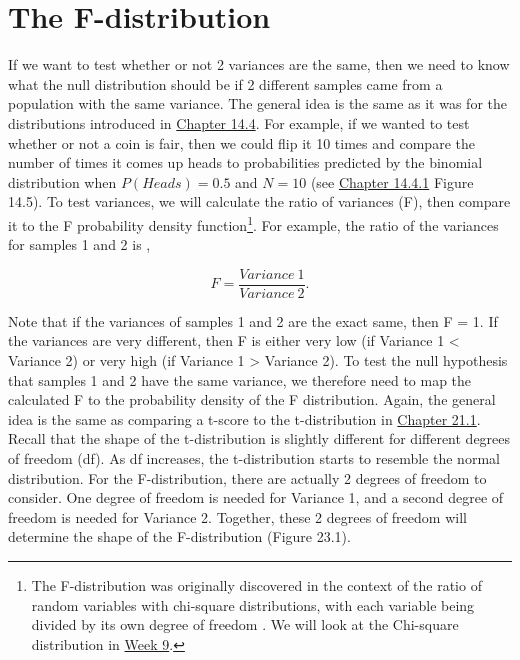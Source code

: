 \documentclass[
]{scrbook}
\begin{document}
\hypertarget{the-f-distribution}{%
\section{The F-distribution}\label{the-f-distribution}}

If we want to test whether or not 2 variances are the same, then we need to know what the null distribution should be if 2 different samples came from a population with the same variance.
The general idea is the same as it was for the distributions introduced in \protect\hyperlink{probability-distributions}{Chapter 14.4}.
For example, if we wanted to test whether or not a coin is fair, then we could flip it 10 times and compare the number of times it comes up heads to probabilities predicted by the binomial distribution when \(P(Heads) = 0.5\) and \(N = 10\) (see \protect\hyperlink{binomial-distribution}{Chapter 14.4.1} Figure 14.5).
To test variances, we will calculate the ratio of variances (F), then compare it to the F probability density function\footnote{The F-distribution was originally discovered in the context of the ratio of random variables with chi-square distributions, with each variable being divided by its own degree of freedom \citep{Miller2004}. We will look at the Chi-square distribution in \protect\hyperlink{Week9}{Week 9}.}.
For example, the ratio of the variances for samples 1 and 2 is \citep{Sokal1995},

\[F = \frac{Variance\:1}{Variance\:2}.\]

Note that if the variances of samples 1 and 2 are the exact same, then F = 1.
If the variances are very different, then F is either very low (if Variance 1 \textless{} Variance 2) or very high (if Variance 1 \textgreater{} Variance 2).
To test the null hypothesis that samples 1 and 2 have the same variance, we therefore need to map the calculated F to the probability density of the F distribution.
Again, the general idea is the same as comparing a t-score to the t-distribution in \protect\hyperlink{one-sample-t-test}{Chapter 21.1}.
Recall that the shape of the t-distribution is slightly different for different degrees of freedom (df).
As df increases, the t-distribution starts to resemble the normal distribution.
For the F-distribution, there are actually 2 degrees of freedom to consider.
One degree of freedom is needed for Variance 1, and a second degree of freedom is needed for Variance 2.
Together, these 2 degrees of freedom will determine the shape of the F-distribution (Figure 23.1).
\end{document}
